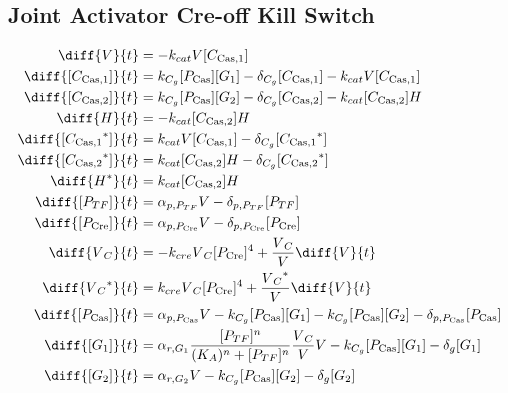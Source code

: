\subsection{Joint Activator Cre-off Kill Switch}
\label{s:Joint_Activator_Cre_off_Kill_Switch}

\begin{align}
\diff{\vectorGen{}}{t} & = - \casCutRate{{}}\vectorGen{}\conc{\cplx{\cas}{1}}\\
\diff{\conc{\cplx{\cas}{1}}}{t} & =  \gRnaBind{}\conc{\proSp{\cas{}}}\conc{\gRna{1}} - \casCompDegradeRate{}\conc{\cplx{\cas}{1}} - \casCutRate{{}}\vectorGen{}\conc{\cplx{\cas}{1}}\\
\diff{\conc{\cplx{\cas}{2}}}{t} & =  \gRnaBind{}\conc{\proSp{\cas{}}}\conc{\gRna{2}} - \casCompDegradeRate{}\conc{\cplx{\cas}{2}} - \casCutRate{{}}\conc{\cplx{\cas}{2}}\hostGen{}\\
\diff{\hostGen{}}{t} & = - \casCutRate{{}}\conc{\cplx{\cas}{2}}\hostGen{}\\
\diff{\conc{\bound{\cplx{\cas}{1}}}}{t} & =  \casCutRate{{}}\vectorGen{}\conc{\cplx{\cas}{1}} - \casCompDegradeRate{}\conc{\bound{\cplx{\cas}{1}}}\\
\diff{\conc{\bound{\cplx{\cas}{2}}}}{t} & =  \casCutRate{{}}\conc{\cplx{\cas}{2}}\hostGen{} - \casCompDegradeRate{}\conc{\bound{\cplx{\cas}{2}}}\\
\diff{\edited{\hostGen{}}}{t} & =  \casCutRate{{}}\conc{\cplx{\cas}{2}}\hostGen{}\\
\diff{\conc{\proSp{TF}}}{t} & =  \txtlRate{\proSp{TF}}\vectorGen{} - \proDegradeRate{\proSp{TF}}\conc{\proSp{TF}}\\
\diff{\conc{\proSp{\cre{}}}}{t} & =  \txtlRate{\proSp{\cre{}}}\vectorGen{} - \proDegradeRate{\proSp{\cre{}}}\conc{\proSp{\cre{}}}\\
\diff{\vectorGen{}_C}{t} & = - \creCutRate{} \vectorGen{}_C \conc{\proSp{\cre{}}}^4 + \frac{\vectorGen{}_C}{\vectorGen{}} \diff{\vectorGen{}}{t}\\
\diff{\edited{\vectorGen{}_C}}{t} & =  \creCutRate{} \vectorGen{}_C \conc{\proSp{\cre{}}}^4 + \frac{\edited{\vectorGen{}_C}}{\vectorGen{}} \diff{\vectorGen{}}{t}\\
\diff{\conc{\proSp{\cas{}}}}{t} & =  \txtlRate{\proSp{\cas{}}}\vectorGen{} - \gRnaBind{}\conc{\proSp{\cas{}}}\conc{\gRna{1}} - \gRnaBind{}\conc{\proSp{\cas{}}}\conc{\gRna{2}} - \proDegradeRate{\proSp{\cas{}}}\conc{\proSp{\cas{}}}\\
\diff{\conc{\gRna{1}}}{t} & =  \txRate{\gRna{1}}\frac{\conc{\proSp{TF}}^n}{(K_A)^n + \conc{\proSp{TF}}^n}\frac{\vectorGen{}_C}{\vectorGen{}}\vectorGen{} - \gRnaBind{}\conc{\proSp{\cas{}}}\conc{\gRna{1}} - \rnaDegradeRate{}\conc{\gRna{1}}\\
\diff{\conc{\gRna{2}}}{t} & =  \txRate{\gRna{2}}\vectorGen{} - \gRnaBind{}\conc{\proSp{\cas{}}}\conc{\gRna{2}} - \rnaDegradeRate{}\conc{\gRna{2}}
\end{align}

